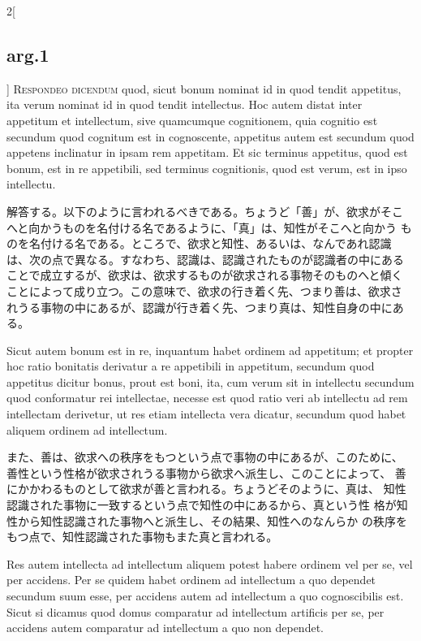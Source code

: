 \documentclass[paper=a4paper,fontsize=10pt,jafontsize=9pt,titlepage]{jlreq}
\begin{document}
\begin{paracol}{2}[\subsection{arg.1}]
{\scshape Respondeo dicendum} quod, sicut bonum nominat id in quod
tendit appetitus, ita verum nominat id in quod tendit intellectus. Hoc
autem distat inter appetitum et intellectum, sive quamcumque
cognitionem, quia cognitio est secundum quod cognitum est in
cognoscente, appetitus autem est secundum quod appetens inclinatur in
ipsam rem appetitam. Et sic terminus appetitus, quod est bonum, est in
re appetibili, sed terminus cognitionis, quod est verum, est in ipso
intellectu.

\switchcolumn

解答する。以下のように言われるべきである。ちょうど「善」が、欲求がそこ
へと向かうものを名付ける名であるように、「真」は、知性がそこへと向かう
ものを名付ける名である。ところで、欲求と知性、あるいは、なんであれ認識
は、次の点で異なる。すなわち、認識は、認識されたものが認識者の中にある
ことで成立するが、欲求は、欲求するものが欲求される事物そのものへと傾く
ことによって成り立つ。この意味で、欲求の行き着く先、つまり善は、欲求さ
れうる事物の中にあるが、認識が行き着く先、つまり真は、知性自身の中にあ
る。

\switchcolumn*


\hspace{1em}Sicut autem bonum est in re, inquantum habet ordinem ad
appetitum; et propter hoc ratio bonitatis derivatur a re appetibili in
appetitum, secundum quod appetitus dicitur bonus, prout est boni, ita,
cum verum sit in intellectu secundum quod conformatur rei intellectae,
necesse est quod ratio veri ab intellectu ad rem intellectam derivetur,
ut res etiam intellecta vera dicatur, secundum quod habet aliquem
ordinem ad intellectum.

\switchcolumn

また、善は、欲求への秩序をもつという点で事物の中にあるが、このために、
 善性という性格が欲求されうる事物から欲求へ派生し、このことによって、
 善にかかわるものとして欲求が善と言われる。ちょうどそのように、真は、
 知性認識された事物に一致するという点で知性の中にあるから、真という性
 格が知性から知性認識された事物へと派生し、その結果、知性へのなんらか
 の秩序をもつ点で、知性認識された事物もまた真と言われる。

\switchcolumn*


\hspace{1em}Res autem intellecta ad intellectum aliquem potest habere
ordinem vel per se, vel per accidens. Per se quidem habet ordinem ad
intellectum a quo dependet secundum suum esse, per accidens autem ad
intellectum a quo cognoscibilis est. Sicut si dicamus quod domus
comparatur ad intellectum artificis per se, per accidens autem
comparatur ad intellectum a quo non dependet.


\end{paracol}
\end{document}
